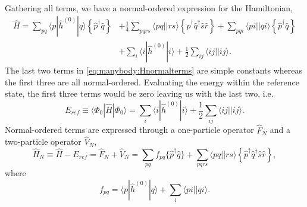 \paragraph*{}
Gathering all terms, we have a normal-ordered expression for the Hamiltonian,
\begin{equation}
\label{eq:manybody:Hnormalterms}
\begin{split}
\hat{H} 
=
\sum_{pq} \langle p|\hat{h}^{(0)} | q\rangle 
\left\lbrace \hat{p}^{\dagger} \hat{q} \right\rbrace
&+
\frac{1}{4} \sum_{pqrs} \langle pq || rs \rangle \left\lbrace
 \hat{p}^{\dagger} \hat{q}^{\dagger} \hat{s} \hat{r} \right\rbrace
+
\sum_{pqi} \langle pi || qi \rangle 
 \left\lbrace \hat{p}^{\dagger} \hat{q} \right\rbrace  \\
&+
\sum_i \langle i | \hat{h}^{(0)} | i \rangle
+
\frac{1}{2} \sum_{ij} \langle ij || ij \rangle .
\end{split}
\end{equation}
The last two terms in \eqref{eq:manybody:Hnormalterms} are simple constants whereas the first three are all normal-ordered.
Evaluating the energy within the reference state, the first three terms would be zero leaving us with the last two, i.e.
\begin{equation}
\label{eq:manybody:Eref}
E_{ref} \equiv \langle \Phi_0 | \hat{H} | \Phi_0 \rangle 
= 
\sum_i \langle i | \hat{h}^{(0)} | i \rangle
+
\frac{1}{2} \sum_{ij} \langle ij || ij \rangle .
\end{equation}
Normal-ordered terms are expressed through a one-particle operator $\hat{F}_N$ and a two-particle operator $\hat{V}_N$,
\begin{equation}
\label{eq:manybody:normhamil}
\hat{H}_N \equiv \hat{H} - E_{ref} 
=
\hat{F}_N + \hat{V}_N
= 
\sum_{pq} f_{pq} \lbrace \hat{p}^{\dagger} \hat{q} \rbrace
+
\sum_{pqrs} \langle pq||rs \rangle 
\left\lbrace \hat{p}^{\dagger} \hat{q}^{\dagger} \hat{s} \hat{r} \right\rbrace ,
\end{equation}
where 
\begin{equation}
\label{eq:manybody:f_elem}
f_{pq} = \langle p | \hat{h}^{(0)} | q \rangle + \sum_i \langle pi||qi \rangle .
\end{equation}







